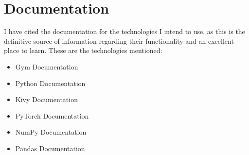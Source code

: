 \documentclass[]{final_report}
\begin{document}
\section{Documentation}
I have cited the documentation for the technologies I intend to use, as this is the definitive source of information regarding their functionality and an excellent place to learn. These are the technologies mentioned: 

\begin{itemize}
  \item Gym Documentation\cite{gym}
  \item Python Documentation\cite{python}
  \item Kivy Documentation\cite{kivy}
  \item PyTorch Documentation\cite{pytorch}
  \item NumPy Documentation\cite{numpy}
  \item Pandas Documentation\cite{pandas} 
\end{itemize}


\newpage



\label{endpage}
\end{document}
